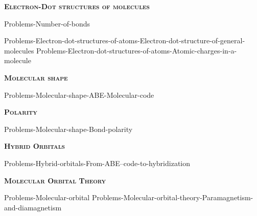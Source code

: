 \documentclass[main.tex]{subfiles}
\begin{document}
\newcommand\chapterlabel{Ch-electronicstructure}
\newpage
{}\renewcommand{\bondwidth}{0.06642 em}  
\fancyhfoffset[E,O]{0pt}
\setlength{\columnsep}{30pt}
\begin{conclusion}
\iftoggle{chem121}{}{\setcounter{chapter}{9}}
\end{conclusion}
\begin{multicols*}{2}\setcounter{numA}{1}  %

{\raggedright\textsc{\textbf{Electron-Dot structures of molecules }}\par}

{Problems-Number-of-bonds}



{Problems-Electron-dot-structures-of-atoms-Electron-dot-structure-of-general-molecules}
{Problems-Electron-dot-structures-of-atoms-Atomic-charges-in-a-molecule}
{\raggedright\textsc{\textbf{Molecular shape}}\par}
{Problems-Molecular-shape-ABE-Molecular-code}


{\raggedright\textsc{\textbf{Polarity}}\par}
{Problems-Molecular-shape-Bond-polarity}
{\raggedright\textsc{\textbf{Hybrid Orbitals}}\par}
{Problems-Hybrid-orbitals-From-ABE--code-to-hybridization}
{\raggedright\textsc{\textbf{Molecular Orbital Theory}}\par}
{Problems-Molecular-orbital}
{Problems-Molecular-orbital-theory-Paramagnetism-and-diamagnetism}


 


\end{multicols*} \iftoggle{showfinalanswers}{
\newpage\fancyhfoffset[E,O]{0pt}
\begin{answerbox}
\begin{answersenvironment}
 \begin{localsize}{10}
{ \checkoddpage\ifoddpage    \else   \clearpage\thispagestyle{empty}\mbox{}\clearpage\fi
\Large \bf Answers}
\SetupExSheets{ headings = inline-nr , counter-format = qu) ,}
\providetoggle{printOddAnswers}\settoggle{printOddAnswers}{\printOddAnswers}\iftoggle{printOddAnswers}{\printsolutions[section] }{\printsolutions}
  \vspace{20cm}
 \end{localsize}
 \end{answersenvironment}
\end{answerbox}
}{}
\checkoddpage\ifoddpage   \clearpage\thispagestyle{empty}\mbox{}\clearpage \else   \fi
\end{document}

